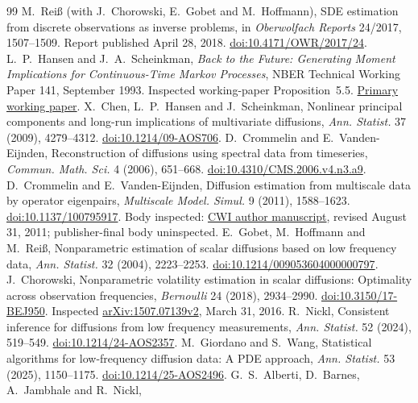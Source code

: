\documentclass[11pt]{article}
\theoremstyle{remark}\newtheorem{remark}[theorem]{Remark}
\begin{document}
\begin{thebibliography}{99}
 M.~Rei\ss{} (with J.~Chorowski, E.~Gobet and M.~Hoffmann),
SDE estimation from discrete observations as inverse problems, in
\emph{Oberwolfach Reports} 24/2017, 1507--1509. Report published April 28,
2018. \href{https://doi.org/10.4171/OWR/2017/24}{doi:10.4171/OWR/2017/24}.
 L.~P.~Hansen and J.~A.~Scheinkman,
\emph{Back to the Future: Generating Moment Implications for Continuous-Time
Markov Processes}, NBER Technical Working Paper 141, September 1993.
Inspected working-paper Proposition~5.5.
\href{https://www.nber.org/system/files/working_papers/t0141/t0141.pdf}{Primary working paper}.
 X.~Chen, L.~P.~Hansen and J.~Scheinkman,
Nonlinear principal components and long-run implications of multivariate
diffusions, \emph{Ann. Statist.} 37 (2009), 4279--4312.
\href{https://doi.org/10.1214/09-AOS706}{doi:10.1214/09-AOS706}.
 D.~Crommelin and E.~Vanden-Eijnden,
Reconstruction of diffusions using spectral data from timeseries,
\emph{Commun. Math. Sci.} 4 (2006), 651--668.
\href{https://doi.org/10.4310/CMS.2006.v4.n3.a9}{doi:10.4310/CMS.2006.v4.n3.a9}.
 D.~Crommelin and E.~Vanden-Eijnden,
Diffusion estimation from multiscale data by operator eigenpairs,
\emph{Multiscale Model. Simul.} 9 (2011), 1588--1623.
\href{https://doi.org/10.1137/100795917}{doi:10.1137/100795917}.
Body inspected: \href{https://ir.cwi.nl/pub/18934/18934B.pdf}{CWI author
manuscript}, revised August 31, 2011; publisher-final body uninspected.
 E.~Gobet, M.~Hoffmann and M.~Rei\ss{},
Nonparametric estimation of scalar diffusions based on low frequency data,
\emph{Ann. Statist.} 32 (2004), 2223--2253.
\href{https://doi.org/10.1214/009053604000000797}{doi:10.1214/009053604000000797}.
 J.~Chorowski,
Nonparametric volatility estimation in scalar diffusions: Optimality across
observation frequencies, \emph{Bernoulli} 24 (2018), 2934--2990.
\href{https://doi.org/10.3150/17-BEJ950}{doi:10.3150/17-BEJ950}.
Inspected \href{https://arxiv.org/abs/1507.07139v2}{arXiv:1507.07139v2},
March 31, 2016.
 R.~Nickl,
Consistent inference for diffusions from low frequency measurements,
\emph{Ann. Statist.} 52 (2024), 519--549.
\href{https://doi.org/10.1214/24-AOS2357}{doi:10.1214/24-AOS2357}.
 M.~Giordano and S.~Wang,
Statistical algorithms for low-frequency diffusion data: A PDE approach,
\emph{Ann. Statist.} 53 (2025), 1150--1175.
\href{https://doi.org/10.1214/25-AOS2496}{doi:10.1214/25-AOS2496}.
 G.~S.~Alberti, D.~Barnes, A.~Jambhale and R.~Nickl,

\end{thebibliography}
\end{document}
